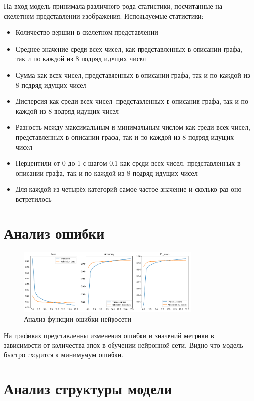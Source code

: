 \documentclass{llncs}
\begin{document}
На вход модель принимала различного рода статистики, посчитанные на скелетном представлении изображения.
Используемые статистики:
\begin{itemize}
    \item Количество вершин в скелетном представлении
    \item Среднее значение среди всех чисел, как представленных в описании графа, так и по каждой из 8 подряд идущих чисел
    \item Сумма как всех чисел, представленных в описании графа, так и по каждой из 8 подряд идущих чисел
    \item Дисперсия как среди всех чисел, представленных в описании графа, так и по каждой из 8 подряд идущих чисел
    \item Разность между максимальным и минимальным числом как среди всех чисел, представленных в описании графа, так и по каждой из 8 подряд идущих чисел
    \item Перцентили от 0 до 1 с шагом 0.1 как среди всех чисел, представленных в описании графа, так и по каждой из 8 подряд идущих чисел
    \item Для каждой из четырёх категорий самое частое значение и сколько раз оно встретилось
\end{itemize}

\section{Анализ ошибки}

\begin{figure}
\centering
\caption{Анализ функции ошибки нейросети\label{overflow}}
\begin{center}
    \includegraphics[width=90mm]{loss.jpg}
  \end{center}
\end{figure}
На графиках представленны изменения ошибки и значений метрики в зависимости от количества эпох в обучении нейронной сети. Видно что модель быстро сходится к минимумум ошибки.

\section{Анализ структуры модели}
\end{document}

